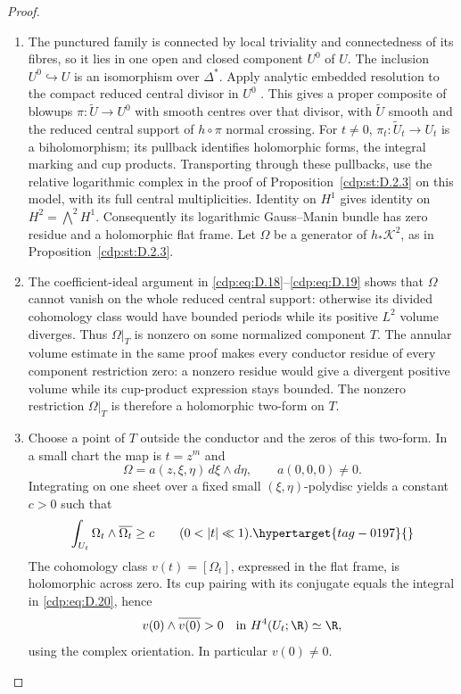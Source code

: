 \begin{proof}

\begin{enumerate}[leftmargin=*]
\item The punctured family is connected by local triviality and connectedness
of its fibres, so it lies in one open and closed component $U^0$ of $U$.
The inclusion $U^0\hookrightarrow U$ is an isomorphism over $\Delta^*$.
Apply analytic embedded resolution to the compact reduced central divisor
in $U^0$ \cite[\S0.2(2), preprint p.~3; Theorem~1.6 and Remarks~1.7,
preprint pp.~5--6]{BierstoneMilman1997}. This gives a proper composite
of blowups $\pi:\widetilde U\to U^0$ with smooth centres over that
divisor, with $\widetilde U$ smooth and the reduced central support
of $h\circ\pi$ normal crossing. For $t\ne0$,
$\pi_t:\widetilde U_t\to U_t$ is a biholomorphism;
its pullback identifies holomorphic forms, the integral marking and
cup products. Transporting through these pullbacks, use the relative
logarithmic complex in the proof of Proposition~\ref{cdp:st:D.2.3}
on this model, with its full central multiplicities.
Identity on $H^1$ gives identity on $H^2=\bigwedge^2H^1$.
Consequently its logarithmic Gauss--Manin bundle has zero
residue and a holomorphic flat frame. Let $\Omega$ be a
generator of $h_*\mathscr K^2$, as in Proposition~\ref{cdp:st:D.2.3}.

\item The coefficient-ideal argument in
\eqref{cdp:eq:D.18}--\eqref{cdp:eq:D.19} shows that $\Omega$
cannot vanish on the whole reduced central support: otherwise
its divided cohomology class would have bounded periods while
its positive $L^2$ volume diverges. Thus $\Omega|_T$ is nonzero
on some normalized component $T$. The annular volume estimate
in the same proof makes every conductor residue of every
component restriction zero: a nonzero residue would give a
divergent positive volume while its cup-product expression
stays bounded. The nonzero restriction $\Omega|_T$ is therefore
a holomorphic two-form on $T$.

\item Choose a point of $T$ outside the conductor and the zeros of
this two-form. In a small chart the map is $t=z^m$ and
\[
 \Omega=a(z,\xi,\eta)\,d\xi\wedge d\eta,
 \qquad a(0,0,0)\ne0.
\]
Integrating on one sheet over a fixed small
$(\xi,\eta)$-polydisc yields a constant $c>0$ such that
\begin{equation}
 \int_{U_t}\Omega_t\wedge\overline{\Omega_t}\ge c
 \qquad(0<|t|\ll1).
\hypertarget{tag-0197}{}\label{cdp:eq:D.20}
\end{equation}
The cohomology class $v(t)=[\Omega_t]$, expressed in the flat
frame, is holomorphic across zero. Its cup pairing with its conjugate equals the
integral in \eqref{cdp:eq:D.20}, hence
\[
 v(0)\wedge\overline{v(0)}>0
 \quad\hbox{in }H^4(U_t;\R)\simeq\R,
\]
using the complex orientation. In particular $v(0)\ne0$.


\end{enumerate}
\end{proof}
